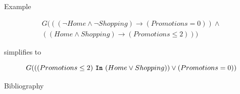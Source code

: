 \documentclass[usenames,dvipsnames]{beamer}
\theoremstyle{definition}
\begin{document}
\begin{frame}{Example}
  \begin{example}
    \begin{gather}
      G(((\neg Home\land\neg Shopping) \rightarrow (Promotions = 0)) \land \nonumber \\
      ((Home\land Shopping) \rightarrow (Promotions \leq 2))) \nonumber
    \end{gather}
  \end{example}

  simplifies to

  \begin{example}
    \label{example:in-operator-simple}
    $$
    G(((Promotions \leq 2)\ \textbf{\texttt{In}}\ (Home\lor Shopping))\lor(Promotions=0))
    $$
  \end{example}
\end{frame}


\begin{frame}[t,allowframebreaks]{Bibliography}
  \printbibliography
\end{frame}
\end{document}
